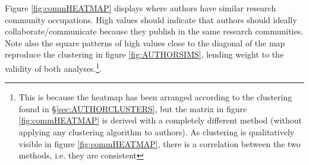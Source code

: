 \newpage
Figure \ref{fig:commHEATMAP} displays where authors have similar research community occupations. High values should indicate that authors should ideally collaborate/communicate because they publish in the same research communities. Note also the square patterns of high values close to the diagonal of the map reproduce the clustering in figure \ref{fig:AUTHORSIMS}, lending weight to the validity of both analyses.\footnote{This is because the heatmap has been arranged according to the clustering found in \S\ref{sec:AUTHORCLUSTERS}, but the matrix in figure \ref{fig:commHEATMAP} is derived with a completely different method (without applying any clustering algorithm to authors). As clustering is qualitatively visible in figure \ref{fig:commHEATMAP}, there is a correlation between the two methods, i.e. they are consistent}.

